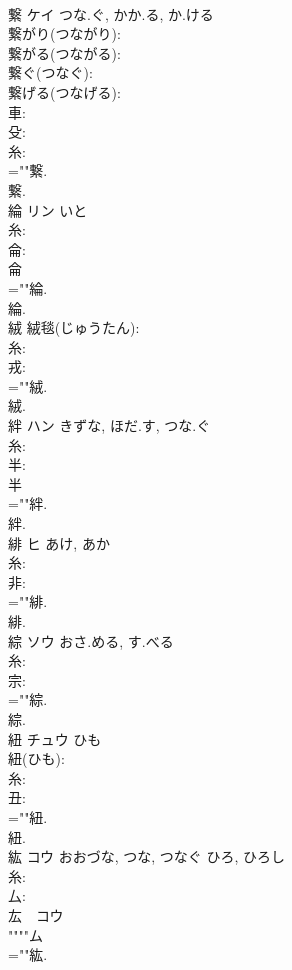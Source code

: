 \documentclass[8pt]{extreport}
\begin{document}
\begin{CJK}{UTF8}{min}
\\	繋	ケイ	つな.ぐ, かか.る, か.ける		
\\	繋がり(つながり): 
\\	繋がる(つながる): 
\\	繋ぐ(つなぐ): 
\\	繋げる(つなげる): 
\\	車: 
\\	殳: 
\\	糸: 
\\	=""繋.
\\	繋.
\\	綸	リン	いと		
\\	糸: 
\\	侖: 
\\	侖 
\\	=""綸.
\\	綸.
\\	絨					絨毯(じゅうたん): 
\\	糸: 
\\	戎: 
\\	=""絨.
\\	絨.
\\	絆	ハン	きずな, ほだ.す, つな.ぐ		
\\	糸: 
\\	半: 
\\	半 
\\	=""絆.
\\	絆.
\\	緋	ヒ	あけ, あか		
\\	糸: 
\\	非: 
\\	=""緋.
\\	緋.
\\	綜	ソウ	おさ.める, す.べる		
\\	糸: 
\\	宗: 
\\	=""綜.
\\	綜.
\\	紐	チュウ	ひも		
\\	紐(ひも): 
\\	糸: 
\\	丑: 
\\	=""紐.
\\	紐.
\\	紘	コウ	おおづな, つな, つなぐ	ひろ, ひろし	
\\	糸: 
\\	厶: 
\\	厷　コウ　
\\	""""ム
\\	=""紘.

\end{CJK}
\end{document}
